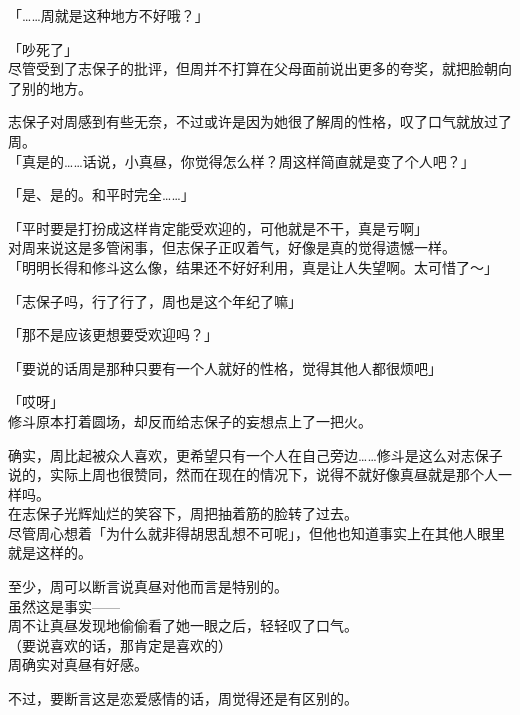 「……周就是这种地方不好哦？」

「吵死了」\\

尽管受到了志保子的批评，但周并不打算在父母面前说出更多的夸奖，就把脸朝向了别的地方。

志保子对周感到有些无奈，不过或许是因为她很了解周的性格，叹了口气就放过了周。\\

「真是的……话说，小真昼，你觉得怎么样？周这样简直就是变了个人吧？」

「是、是的。和平时完全……」

「平时要是打扮成这样肯定能受欢迎的，可他就是不干，真是亏啊」\\

对周来说这是多管闲事，但志保子正叹着气，好像是真的觉得遗憾一样。\\

「明明长得和修斗这么像，结果还不好好利用，真是让人失望啊。太可惜了～」

「志保子吗，行了行了，周也是这个年纪了嘛」

「那不是应该更想要受欢迎吗？」

「要说的话周是那种只要有一个人就好的性格，觉得其他人都很烦吧」

「哎呀」\\

修斗原本打着圆场，却反而给志保子的妄想点上了一把火。

确实，周比起被众人喜欢，更希望只有一个人在自己旁边……修斗是这么对志保子说的，实际上周也很赞同，然而在现在的情况下，说得不就好像真昼就是那个人一样吗。\\

在志保子光辉灿烂的笑容下，周把抽着筋的脸转了过去。\\

尽管周心想着「为什么就非得胡思乱想不可呢」，但他也知道事实上在其他人眼里就是这样的。

至少，周可以断言说真昼对他而言是特别的。\\

虽然这是事实——\\

周不让真昼发现地偷偷看了她一眼之后，轻轻叹了口气。\\

（要说喜欢的话，那肯定是喜欢的）\\

周确实对真昼有好感。

不过，要断言这是恋爱感情的话，周觉得还是有区别的。\\

